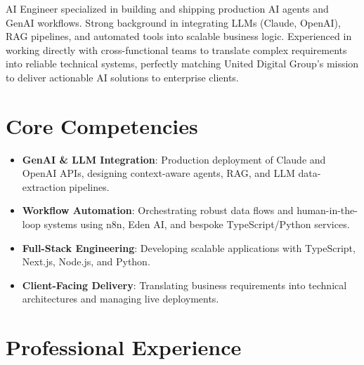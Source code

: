\documentclass[11pt,a4paper,sans]{moderncv}
\begin{document}
\makecvtitle

\vspace{-2em}
AI Engineer specialized in building and shipping production AI agents and GenAI workflows. Strong background in integrating LLMs (Claude, OpenAI), RAG pipelines, and automated tools into scalable business logic. Experienced in working directly with cross-functional teams to translate complex requirements into reliable technical systems, perfectly matching United Digital Group's mission to deliver actionable AI solutions to enterprise clients.

\section{Core Competencies}
\vspace{1pt}
\begin{itemize}
\item \textbf{GenAI \& LLM Integration}: Production deployment of Claude and OpenAI APIs, designing context-aware agents, RAG, and LLM data-extraction pipelines.
\item \textbf{Workflow Automation}: Orchestrating robust data flows and human-in-the-loop systems using n8n, Eden AI, and bespoke TypeScript/Python services.
\item \textbf{Full-Stack Engineering}: Developing scalable applications with TypeScript, Next.js, Node.js, and Python.
\item \textbf{Client-Facing Delivery}: Translating business requirements into technical architectures and managing live deployments.
\end{itemize}

\section{Professional Experience}
\vspace{3pt}

\end{document}
